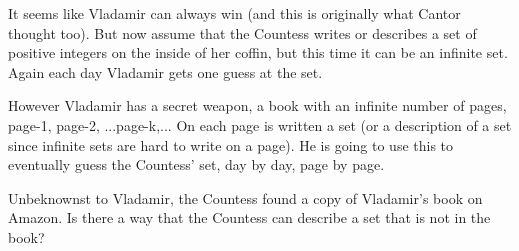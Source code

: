 \newpage
\begin{problem}
It seems like Vladamir can always win (and this is originally what Cantor thought too).  But now assume that the Countess writes or describes a  set of positive integers on the inside of her coffin, but this time it can be an infinite set.  Again each day Vladamir gets one guess at the set.  

However Vladamir has a secret weapon, a book with an infinite number of pages, page-1, page-2, ...page-k,...  On each page is written a set (or a description of a set since infinite sets are hard to write on a page).  He is going to use this to eventually guess the Countess' set, day by day, page by page.  

Unbeknownst to Vladamir, the Countess found a copy of Vladamir's  book on Amazon.  Is there a way that the Countess can describe a set that is not in the book?
\label{vampire6}
\end{problem}

